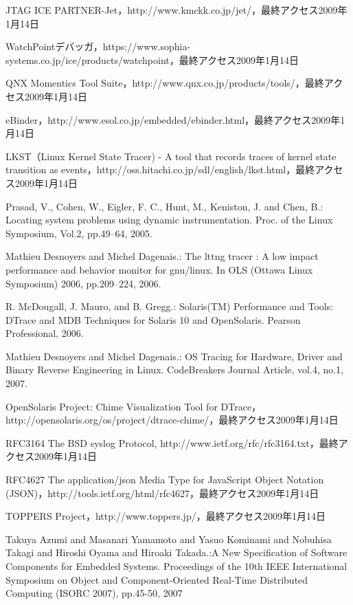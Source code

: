 \begin{thebibliography}{99}
JTAG ICE PARTNER-Jet，http://www.kmckk.co.jp/jet/，最終アクセス2009年1月14日

WatchPointデバッガ，https://www.sophia-systems.co.jp/ice/products/watchpoint，最終アクセス2009年1月14日

QNX Momentics Tool Suite，http://www.qnx.co.jp/products/tools/，最終アクセス2009年1月14日

eBinder，http://www.esol.co.jp/embedded/ebinder.html，最終アクセス2009年1月14日

LKST（Linux Kernel State Tracer) - A tool that records
traces of kernel state transition as events，http://oss.hitachi.co.jp/sdl/english/lkst.html，最終アクセス2009年1月14日

Prasad, V., Cohen, W., Eigler, F. C., Hunt, M., Keniston, J. and Chen, B.: Locating system problems using dynamic instrumentation. Proc. of the Linux Symposium, Vol.2, pp.49–64, 2005.

Mathieu Desnoyers and Michel Dagenais.: The lttng tracer : A low impact performance and behavior monitor for gnu/linux. In OLS (Ottawa Linux Symposium) 2006, pp.209–224, 2006.

R. McDougall, J. Mauro, and B. Gregg.: Solaris(TM) Performance and Tools: DTrace and MDB Techniques for Solaris 10 and OpenSolaris. Pearson Professional, 2006.

Mathieu Desnoyers and Michel Dagenais.: OS Tracing for Hardware, Driver and Binary Reverse Engineering in Linux. CodeBreakers Journal Article, vol.4, no.1, 2007.

OpenSolaris Project: Chime Visualization Tool for DTrace，http://opensolaris.org/os/project/dtrace-chime/，最終アクセス2009年1月14日

RFC3164 The BSD syslog Protocol, http://www.ietf.org/rfc/rfc3164.txt，最終アクセス2009年1月14日

RFC4627 The application/json Media Type for JavaScript Object Notation (JSON)，http://tools.ietf.org/html/rfc4627，最終アクセス2009年1月14日

TOPPERS Project，http://www.toppers.jp/，最終アクセス2009年1月14日

Takuya Azumi and Masanari Yamamoto and Yasuo Kominami and Nobuhisa Takagi and Hiroshi Oyama and Hiroaki Takada.:A New Specification of Software Components for Embedded Systems. Proceedings of the 10th IEEE International Symposium on Object and Component-Oriented Real-Time Distributed Computing (ISORC 2007), pp.45-50, 2007

\end{thebibliography}
